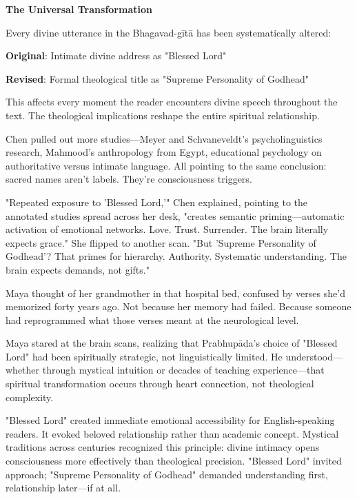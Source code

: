 \documentclass[12pt,twoside]{book}
\begin{document}
\vspace{-0.5cm}

\vspace{0.5cm}
\textbf{The Universal Transformation}
\vspace{0.2cm}


Every divine utterance in the Bhagavad-gītā has been systematically altered:

\textbf{\textbf{Original}}: Intimate divine address as "Blessed Lord"

\textbf{\textbf{Revised}}: Formal theological title as "Supreme Personality of Godhead"

This affects every moment the reader encounters divine speech throughout the text. The theological implications reshape the entire spiritual relationship.


Chen pulled out more studies—Meyer and Schvaneveldt's psycholinguistics research, Mahmood's anthropology from Egypt, educational psychology on authoritative versus intimate language. All pointing to the same conclusion: sacred names aren't labels. They're consciousness triggers.

"Repeated exposure to 'Blessed Lord,'" Chen explained, pointing to the annotated studies spread across her desk, "creates semantic priming—automatic activation of emotional networks. Love. Trust. Surrender. The brain literally expects grace." She flipped to another scan. "But 'Supreme Personality of Godhead'? That primes for hierarchy. Authority. Systematic understanding. The brain expects demands, not gifts."

Maya thought of her grandmother in that hospital bed, confused by verses she'd memorized forty years ago. Not because her memory had failed. Because someone had reprogrammed what those verses meant at the neurological level.

Maya stared at the brain scans, realizing that Prabhupāda's choice of "Blessed Lord" had been spiritually strategic, not linguistically limited. He understood—whether through mystical intuition or decades of teaching experience—that spiritual transformation occurs through heart connection, not theological complexity.

"Blessed Lord" created immediate emotional accessibility for English-speaking readers. It evoked beloved relationship rather than academic concept. Mystical traditions across centuries recognized this principle: divine intimacy opens consciousness more effectively than theological precision. "Blessed Lord" invited approach; "Supreme Personality of Godhead" demanded understanding first, relationship later—if at all.
\end{document}
